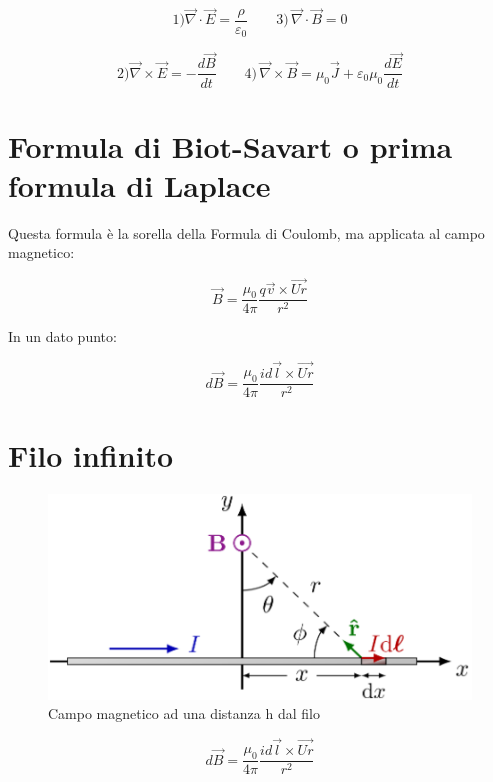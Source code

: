 \begin{equation*}
    1)\vec{\nabla}\cdot \vec{E}  = \frac{\rho}{\varepsilon_0}\qquad3)\,\vec{\nabla} \cdot \vec{B}  = 0
\end{equation*}

\begin{equation*}
    2)\vec{\nabla} \times \vec{E}  = -\frac{d\vec{B}}{dt}\qquad4)\,\vec{\nabla} \times \vec{B}  = \mu_0 \vec{J} + \varepsilon_0\mu_0\frac{d\vec{E}}{dt}
\end{equation*}

\section{Formula di Biot-Savart o prima formula di Laplace}

Questa formula è la sorella della Formula di Coulomb, ma applicata al campo magnetico:

\begin{equation}
    \vec{B} = \frac{\mu_0}{4\pi} \frac{q\vec{v} \times \vec{Ur}}{r^2}
\end{equation}

In un dato punto: 

\begin{equation}
    d\vec{B} = \frac{\mu_0}{4\pi} \frac{i d\vec{l} \times \vec{Ur}}{r^2}
\end{equation}

\section{Filo infinito}

\begin{figure}[H]
    \centering
    \includegraphics[scale = 0.5]{image/filoInfinitoMagnetico.png}
    \caption{Campo magnetico ad una distanza h dal filo}
    \label{campoMagneticodaUnFiloLeggeBiotSavart}
\end{figure}

\begin{equation}
    d\vec{B} = \frac{\mu_0}{4\pi} \frac{i d\vec{l} \times \vec{Ur}}{r^2}
\end{equation}

